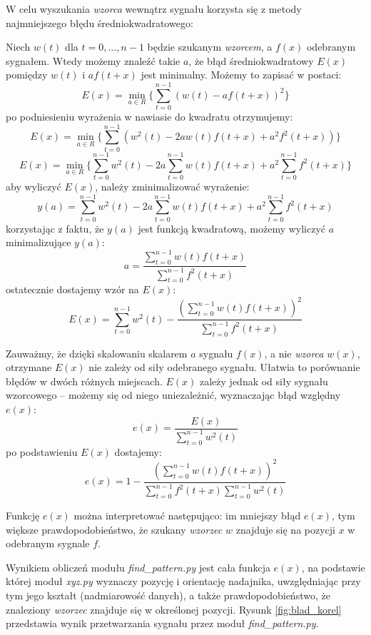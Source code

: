 W celu wyszukania \textit{wzorca} wewnątrz sygnału korzysta się z  metody najmniejszego błędu średniokwadratowego:

Niech $w(t)$  dla $t = 0, ..., n-1$ będzie szukanym \textit{wzorcem}, a $f(x)$ odebranym sygnałem.
Wtedy możemy znaleźć takie $a$, że błąd średniokwadratowy $E(x)$ pomiędzy $w(t)$ i $a f(t+x)$ jest minimalny.
Możemy to zapisać w postaci:
\[
  E(x) = \min_{a \in R} \{ \sum_{t=0}^{n-1}  (w(t) - a f(t+x))^2 \}
\]
po podniesieniu wyrażenia w nawiasie do kwadratu otrzymujemy:
\[
  E(x) = \min_{a \in R} \{ \sum_{t=0}^{n-1}  (w^2(t) -2a w(t) f(t+x) + a^2 f^2(t+x)) \}
\]
\[
  E(x) = \min_{a \in R} \{ \sum_{t=0}^{n-1}  w^2(t) -2a \sum_{t=0}^{n-1}  w(t) f(t+x) + a^2 \sum_{t=0}^{n-1} f^2(t+x) \}
\]
aby wyliczyć $E(x)$, należy zminimalizować wyrażenie:
\[
  y(a) = \sum_{t=0}^{n-1}  w^2(t) -2a \sum_{t=0}^{n-1}  w(t) f(t+x) + a^2 \sum_{t=0}^{n-1} f^2(t+x)
\]
 korzystając z faktu, że $y(a)$ jest funkcją kwadratową, możemy wyliczyć $a$ minimalizujące $y(a)$:
\[
 a = \frac{ \sum\limits_{t=0}^{n-1}  w(t) f(t+x) }{ \sum\limits_{t=0}^{n-1} f^2(t+x) }
\]
ostatecznie dostajemy wzór na $E(x)$:
\[
  E(x) = \sum_{t=0}^{n-1}  w^2(t)  - \frac {(\sum\limits_{t=0}^{n-1}  w(t) f(t+x) )^2 } { \sum\limits_{t=0}^{n-1} f^2(t+x)}
\]

Zauważmy, że dzięki skalowaniu skalarem $a$  sygnału $f(x)$, a nie \textit{wzorca} $w(x)$,
otrzymane $E(x)$ nie zależy od siły odebranego sygnału. Ułatwia to porównanie błędów w dwóch różnych miejscach.
$E(x)$ zależy jednak od siły sygnału wzorcowego -- możemy się od niego  uniezależnić, wyznaczając
błąd względny $e(x)$:
\[
  e(x) = \frac{E(x)}{\sum\limits_{t=0}^{n-1}  w^2(t)}
\]
po podstawieniu $E(x)$ dostajemy:
\[
  e(x) = 1 - \frac {(\sum\limits_{t=0}^{n-1}  w(t) f(t+x) )^2 } { \sum\limits_{t=0}^{n-1} f^2(t+x) \sum\limits_{t=0}^{n-1}  w^2(t)}
\]
 
 Funkcję $e(x)$  można interpretować następująco:
 im mniejszy błąd $e(x)$, tym większe prawdopodobieństwo, że szukany \textit{wzorzec} $w$ znajduje się na pozycji $x$ w 
 odebranym sygnale $f$. 

 Wynikiem obliczeń modułu \textit{find\_pattern.py} jest cała funkcja $e(x)$, na podstawie której moduł \textit{xyz.py}
 wyznaczy pozycję i orientację nadajnika, uwzględniając przy tym 
 jego kształt (nadmiarowość danych), a także prawdopodobieństwo, że znaleziony \textit{wzorzec} znajduje się w określonej pozycji.
 Rysunk \ref{fig:blad_korel} przedstawia wynik przetwarzania sygnału przez moduł \textit{find\_pattern.py}.

